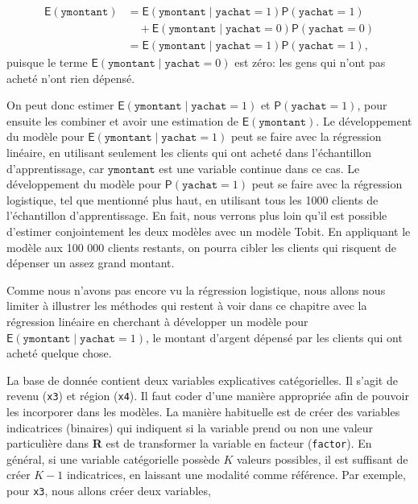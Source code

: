 \documentclass[
  11pt,
  letterpaper,
]{book}
\theoremstyle{definition}
\theoremstyle{remark}
\begin{document}
\begin{align*}
\mathsf{E}(\texttt{ymontant}) &= \mathsf{E}(\texttt{ymontant} \mid \texttt{yachat}=1) \mathsf{P}(\texttt{yachat}=1) \\& \quad + 
\mathsf{E}(\texttt{ymontant} \mid \texttt{yachat}=0) \mathsf{P}(\texttt{yachat}=0) \\
 &= \mathsf{E}(\texttt{ymontant} \mid \texttt{yachat}=1) \mathsf{P}(\texttt{yachat}=1),
\end{align*} puisque le terme
\(\mathsf{E}(\texttt{ymontant} \mid \texttt{yachat}=0)\) est zéro: les
gens qui n'ont pas acheté n'ont rien dépensé.

On peut donc estimer
\(\mathsf{E}(\texttt{ymontant} \mid \texttt{yachat}=1)\) et
\(\mathsf{P}(\texttt{yachat}=1)\), pour ensuite les combiner et avoir
une estimation de \(\mathsf{E}(\texttt{ymontant})\). Le développement du
modèle pour \(\mathsf{E}(\texttt{ymontant} \mid \texttt{yachat}=1)\)
peut se faire avec la régression linéaire, en utilisant seulement les
clients qui ont acheté dans l'échantillon d'apprentissage, car
\(\texttt{ymontant}\) est une variable continue dans ce cas. Le
développement du modèle pour \(\mathsf{P}(\texttt{yachat}=1)\) peut se
faire avec la régression logistique, tel que mentionné plus haut, en
utilisant tous les 1000 clients de l'échantillon d'apprentissage. En
fait, nous verrons plus loin qu'il est possible d'estimer conjointement
les deux modèles avec un modèle Tobit. En appliquant le modèle aux 100
000 clients restants, on pourra cibler les clients qui risquent de
dépenser un assez grand montant.

Comme nous n'avons pas encore vu la régression logistique, nous allons
nous limiter à illustrer les méthodes qui restent à voir dans ce
chapitre avec la régression linéaire en cherchant à développer un modèle
pour \(\mathsf{E}(\texttt{ymontant} \mid \texttt{yachat}=1)\), le
montant d'argent dépensé par les clients qui ont acheté quelque chose.

La base de donnée contient deux variables explicatives catégorielles. Il
s'agit de revenu (\texttt{x3}) et région (\texttt{x4}). Il faut coder
d'une manière appropriée afin de pouvoir les incorporer dans les
modèles. La manière habituelle est de créer des variables indicatrices
(binaires) qui indiquent si la variable prend ou non une valeur
particulière dans \textbf{R} est de transformer la variable en facteur
(\texttt{factor}). En général, si une variable catégorielle possède
\(K\) valeurs possibles, il est suffisant de créer \(K-1\) indicatrices,
en laissant une modalité comme référence. Par exemple, pour \texttt{x3},
nous allons créer deux variables,
\end{document}
